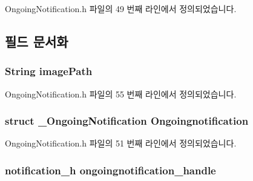 Ongoing\-Notification.\-h 파일의 49 번째 라인에서 정의되었습니다.



\subsection{필드 문서화}
\hypertarget{struct__OngoingNotificationExtend_a7480fd65ec0c3010b75b111ed2611adb}{
\subsubsection[{image\-Path}]{\setlength{\rightskip}{0pt plus 5cm}String image\-Path}}\label{struct__OngoingNotificationExtend_a7480fd65ec0c3010b75b111ed2611adb}


Ongoing\-Notification.\-h 파일의 55 번째 라인에서 정의되었습니다.

\hypertarget{struct__OngoingNotificationExtend_ae6e96ac9bd41838e84b87ca988c9bf29}{
\subsubsection[{Ongoingnotification}]{\setlength{\rightskip}{0pt plus 5cm}struct {\bf \-\_\-\-Ongoing\-Notification} Ongoingnotification}}\label{struct__OngoingNotificationExtend_ae6e96ac9bd41838e84b87ca988c9bf29}


Ongoing\-Notification.\-h 파일의 51 번째 라인에서 정의되었습니다.

\hypertarget{struct__OngoingNotificationExtend_a51c003647fa5a319570219a88a5672ec}{
\subsubsection[{ongoingnotification\-\_\-handle}]{\setlength{\rightskip}{0pt plus 5cm}notification\-\_\-h ongoingnotification\-\_\-handle}}\label{struct__OngoingNotificationExtend_a51c003647fa5a319570219a88a5672ec}


